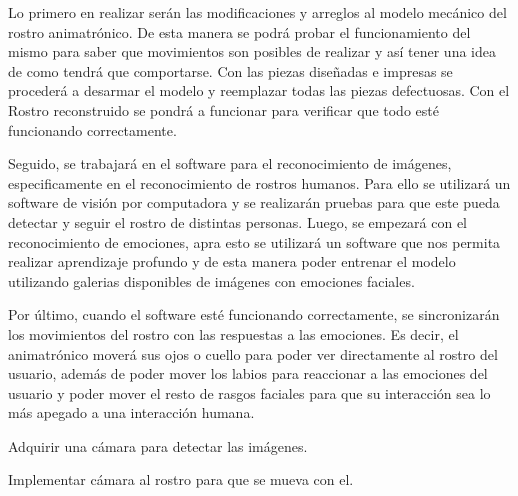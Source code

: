 Lo primero en realizar serán las modificaciones y arreglos al modelo mecánico del rostro animatrónico. De esta manera se podrá probar el funcionamiento del mismo para saber que movimientos son posibles de realizar y así tener una idea de como tendrá que comportarse. Con las piezas diseñadas e impresas se procederá a desarmar el modelo y reemplazar todas las piezas defectuosas. Con el Rostro reconstruido se pondrá a funcionar para verificar que todo esté funcionando correctamente.

Seguido, se trabajará en el software para el reconocimiento de imágenes, especificamente en el reconocimiento de rostros humanos. Para ello se utilizará un software de visión por computadora y se realizarán pruebas para que este pueda detectar y seguir el rostro de distintas personas. Luego, se empezará con el reconocimiento de emociones, apra esto se utilizará un software que nos permita realizar aprendizaje profundo y de esta manera poder entrenar el modelo utilizando galerias disponibles de imágenes con emociones faciales. 

Por último, cuando el software esté funcionando correctamente, se sincronizarán los movimientos del rostro con las respuestas a las emociones. Es decir, el animatrónico moverá sus ojos o cuello para poder ver directamente al rostro del usuario, además de poder mover los labios para reaccionar a las emociones del usuario y poder mover el resto de rasgos faciales para que su interacción sea lo más apegado a una interacción humana. 

Adquirir una cámara para detectar las imágenes.

Implementar cámara al rostro para que se mueva con el.